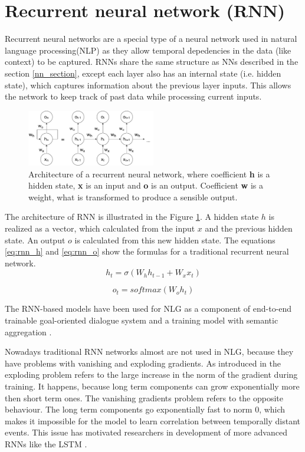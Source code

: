 \section{Recurrent neural network (RNN)} \label{rnn_section}
Recurrent neural networks are a special type of a neural network used in natural language processing(NLP) as they allow temporal depedencies in the data (like context) to be captured. RNNs share the same structure as NNs described in the section \ref{nn_section}, except each layer also has an internal state (i.e. hidden state), which captures information about the previous layer inputs. This allows the network to keep track of past data while processing current inputs.

\begin{figure}[hbt]
  \centering
  \includegraphics[width=0.5\textwidth]{figures/rnn.pdf}
  \caption{Architecture of a recurrent neural network, where coefficient \textbf{h} is a hidden state, \textbf{x} is an input and \textbf{o} is an output. Coefficient \textbf{w} is a weight, what is transformed to produce a sensible output.}
  \label{rnn}
\end{figure}


The architecture of RNN is illustrated in the Figure \ref{rnn}. A hidden state $h$ is realized as a vector, which calculated from the input $x$ and the previous hidden state. An output $o$ is calculated from this new hidden state. 
The equations \ref{eq:rnn_h} and \ref{eq:rnn_o} show the formulas for a traditional recurrent neural network.
\begin{equation} \label{eq:rnn_h}
h_t = \sigma(W_hh_{t-1} + W_xx_t)
\end{equation}

\begin{equation} \label{eq:rnn_o}
o_t = softmax(W_oh_t)
\end{equation}

The RNN-based models have been used for NLG as a component of end-to-end trainable goal-oriented dialogue system \cite{wen2016network} and a training model with semantic aggregation \cite{tran2017neural}. 

Nowadays traditional RNN networks almost are not used in NLG, because they have problems with vanishing and exploding gradients. As introduced in \cite{bengio1994learning} the exploding problem refers to the large increase in the norm of the gradient during training. It happens, because long term components can grow exponentially more then short term ones. The vanishing gradients problem refers to the opposite behaviour. The long term components go exponentially fast to norm 0, which makes it impossible for the model to learn correlation between temporally distant events. This issue has motivated researchers in development of more advanced RNNs like the LSTM \cite{hochreiter1997long}.

